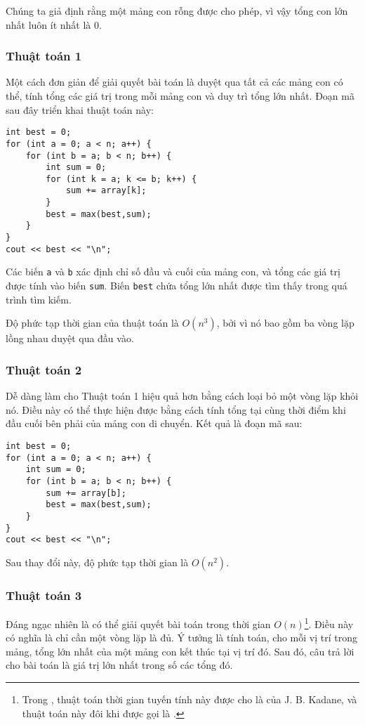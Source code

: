 Chúng ta giả định rằng một mảng con rỗng được cho phép,
vì vậy tổng con lớn nhất luôn ít nhất là $0$.

\subsubsection{Thuật toán 1}

Một cách đơn giản để giải quyết bài toán
là duyệt qua tất cả các mảng con có thể,
tính tổng các giá trị trong mỗi mảng con và duy trì
tổng lớn nhất.
Đoạn mã sau đây triển khai thuật toán này:

\begin{lstlisting}
int best = 0;
for (int a = 0; a < n; a++) {
    for (int b = a; b < n; b++) {
        int sum = 0;
        for (int k = a; k <= b; k++) {
            sum += array[k];
        }
        best = max(best,sum);
    }
}
cout << best << "\n";
\end{lstlisting}

Các biến \texttt{a} và \texttt{b} xác định chỉ số đầu và
cuối của mảng con,
và tổng các giá trị được tính vào biến \texttt{sum}.
Biến \texttt{best} chứa tổng lớn nhất được tìm thấy trong quá trình tìm kiếm.

Độ phức tạp thời gian của thuật toán là $O(n^3)$,
bởi vì nó bao gồm ba vòng lặp lồng nhau
duyệt qua đầu vào.

\subsubsection{Thuật toán 2}

Dễ dàng làm cho Thuật toán 1 hiệu quả hơn
bằng cách loại bỏ một vòng lặp khỏi nó.
Điều này có thể thực hiện được bằng cách tính tổng tại cùng
thời điểm khi đầu cuối bên phải của mảng con di chuyển.
Kết quả là đoạn mã sau:

\begin{lstlisting}
int best = 0;
for (int a = 0; a < n; a++) {
    int sum = 0;
    for (int b = a; b < n; b++) {
        sum += array[b];
        best = max(best,sum);
    }
}
cout << best << "\n";
\end{lstlisting}
Sau thay đổi này, độ phức tạp thời gian là $O(n^2)$.

\subsubsection{Thuật toán 3}

Đáng ngạc nhiên là có thể giải quyết bài toán
trong thời gian $O(n)$\footnote{Trong \cite{ben86}, thuật toán thời gian tuyến tính này
được cho là của J. B. Kadane, và thuật toán này đôi khi
được gọi là  .}. Điều này có nghĩa
là chỉ cần một vòng lặp là đủ.
Ý tưởng là tính toán, cho mỗi vị trí trong mảng,
tổng lớn nhất của một mảng con kết thúc tại vị trí đó.
Sau đó, câu trả lời cho bài toán là
giá trị lớn nhất trong số các tổng đó.

